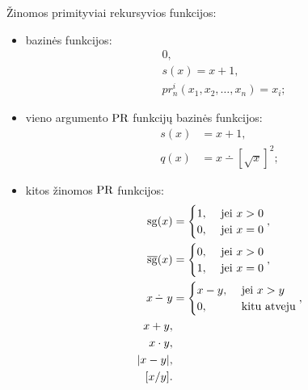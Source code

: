 \begin{note}
  Žinomos primityviai rekursyvios funkcijos:
  \begin{itemize}
    \item bazinės funkcijos:
      \begin{align*}
        & 0,\\
        & s(x) = x + 1, \\
        & pr^{i}_{n}(x_1,x_2,\dotsc,x_n) = x_i;
      \end{align*}
    \item vieno argumento $\mathop{\text{PR}}$ funkcijų bazinės funkcijos:
      \begin{align*}
        s(x) &= x + 1, \\
        q(x) &= x \dotminus \left[ \sqrt{x} \right]^{2};
      \end{align*}
    \item kitos žinomos $\mathop{\text{PR}}$ funkcijos:
      \begin{align*}
        \sg(x) &= %
        \begin{cases}
          1, & \text{ jei } x > 0 \\
          0, & \text{ jei } x = 0
        \end{cases}, \\
        \sgi(x) &= %
        \begin{cases}
          0, & \text{ jei } x > 0 \\
          1, & \text{ jei } x = 0
        \end{cases}, \\
        x \dotminus y &=%
        \begin{cases}
          x - y, & \text{ jei } x > y \\
          0, & \text{ kitu atveju}
        \end{cases}, \\
        x + y,& \\
        x \cdot y, & \\
        |x - y|, & \\
        [x / y]. & 
      \end{align*}
  \end{itemize}
\end{note}

